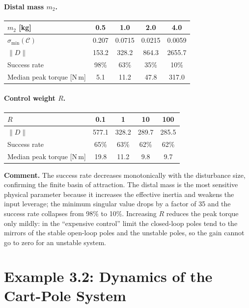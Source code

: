 \documentclass[11pt]{article}
\newcommand{\C}{\mathcal{C}}
\begin{document}
\paragraph{Distal mass $m_2$.}
\begin{center}
\begin{tabular}{lcccc}
\toprule
$m_2$ [kg] & 0.5 & 1.0 & 2.0 & 4.0\\
\midrule
$\sigma_{\min}(\C)$ & 0.207 & 0.0715 & 0.0215 & 0.0059\\
$\|D\|$ & 153.2 & 328.2 & 864.3 & 2655.7\\
Success rate & 98\% & 63\% & 35\% & 10\%\\
Median peak torque [N\,m] & 5.1 & 11.2 & 47.8 & 317.0\\
\bottomrule
\end{tabular}
\end{center}

\paragraph{Control weight $R$.}
\begin{center}
\begin{tabular}{lcccc}
\toprule
$R$ & 0.1 & 1 & 10 & 100\\
\midrule
$\|D\|$ & 577.1 & 328.2 & 289.7 & 285.5\\
Success rate & 65\% & 63\% & 62\% & 62\%\\
Median peak torque [N\,m] & 19.8 & 11.2 & 9.8 & 9.7\\
\bottomrule
\end{tabular}
\end{center}

\textbf{Comment.}  The success rate decreases monotonically with the
disturbance size, confirming the finite basin of attraction.  The distal mass
is the most sensitive physical parameter because it increases the effective
inertia and weakens the input leverage; the minimum singular value drops by a
factor of 35 and the success rate collapses from 98\% to 10\%.  Increasing $R$
reduces the peak torque only mildly: in the ``expensive control'' limit the
closed-loop poles tend to the mirrors of the stable open-loop poles and the
unstable poles, so the gain cannot go to zero for an unstable system.

\section{Example 3.2: Dynamics of the Cart-Pole System}
\end{document}
